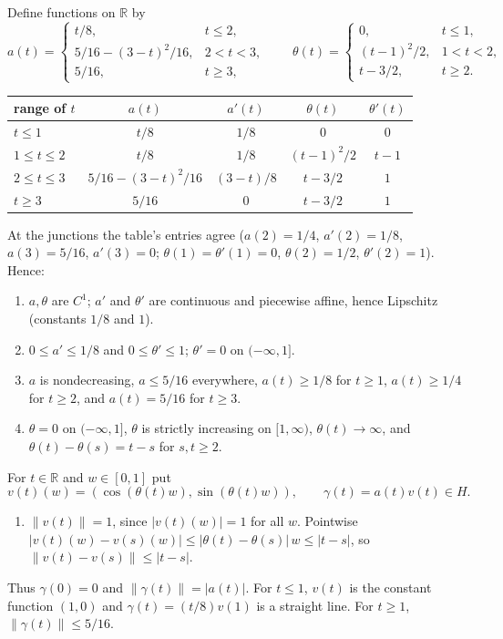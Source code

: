 \documentclass[11pt]{article}
\newcommand{\R}{\mathbb R}
\newcommand{\norm}[1]{\lVert #1\rVert}
\theoremstyle{definition}
\numberwithin{equation}{section}
\begin{document}
Define functions on \(\R\) by
\[
 a(t)=
 \begin{cases}
 t/8,&t\le2,\\
 5/16-(3-t)^2/16,&2<t<3,\\
 5/16,&t\ge3,
 \end{cases}
 \qquad
 \theta(t)=
 \begin{cases}
 0,&t\le1,\\
 (t-1)^2/2,&1<t<2,\\
 t-3/2,&t\ge2.
 \end{cases}
\]
\begin{center}
\begin{tabular}{@{}lcccc@{}}
\toprule
range of \(t\) & \(a(t)\) & \(a'(t)\) & \(\theta(t)\) & \(\theta'(t)\)\\
\midrule
\(t\le1\) & \(t/8\) & \(1/8\) & \(0\) & \(0\)\\
\(1\le t\le2\) & \(t/8\) & \(1/8\) & \((t-1)^2/2\) & \(t-1\)\\
\(2\le t\le3\) & \(5/16-(3-t)^2/16\) & \((3-t)/8\) & \(t-3/2\) & \(1\)\\
\(t\ge3\) & \(5/16\) & \(0\) & \(t-3/2\) & \(1\)\\
\bottomrule
\end{tabular}
\end{center}
At the junctions the table's entries agree
(\(a(2)=1/4\), \(a'(2)=1/8\), \(a(3)=5/16\), \(a'(3)=0\);
\(\theta(1)=\theta'(1)=0\), \(\theta(2)=1/2\), \(\theta'(2)=1\)). Hence:
\begin{enumerate}[label=(F\arabic*)]
\item \(a,\theta\) are \(C^1\); \(a'\) and \(\theta'\) are continuous and
piecewise affine, hence Lipschitz (constants \(1/8\) and \(1\)).
\item \(0\le a'\le1/8\) and \(0\le\theta'\le1\); \(\theta'=0\) on
\((-\infty,1]\).
\item \(a\) is nondecreasing, \(a\le5/16\) everywhere, \(a(t)\ge1/8\) for
\(t\ge1\), \(a(t)\ge1/4\) for \(t\ge2\), and \(a(t)=5/16\) for \(t\ge3\).
\item \(\theta=0\) on \((-\infty,1]\), \(\theta\) is strictly increasing
on \([1,\infty)\), \(\theta(t)\to\infty\), and
\(\theta(t)-\theta(s)=t-s\) for \(s,t\ge2\).
\end{enumerate}
For \(t\in\R\) and \(w\in[0,1]\) put
\[
 v(t)(w)=(\cos(\theta(t)w),\sin(\theta(t)w)),
 \qquad \gamma(t)=a(t)v(t)\in H .
\]
\begin{enumerate}[label=(F\arabic*),resume]
\item \(\norm{v(t)}=1\), since \(|v(t)(w)|=1\) for all \(w\). Pointwise
\(|v(t)(w)-v(s)(w)|\le|\theta(t)-\theta(s)|\,w\le|t-s|\), so
\(\norm{v(t)-v(s)}\le|t-s|\).
\end{enumerate}
Thus \(\gamma(0)=0\) and \(\norm{\gamma(t)}=|a(t)|\). For \(t\le1\),
\(v(t)\) is the constant function \((1,0)\) and \(\gamma(t)=(t/8)v(1)\)
is a straight line. For \(t\ge1\), \(\norm{\gamma(t)}\le5/16\).
\end{document}
